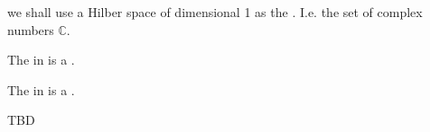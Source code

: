 \begin{example}
  \label{ex:quant_terminal_object}
we shall use a Hilber space of dimensional 1 as the
. I.e. the set of complex numbers
$\mathbb{C}$.   
\end{example}

\begin{example}
  \label{ex:quant_product}
  The  in  is a
  .
\end{example}

\begin{example}
  \label{ex:quant_sum}
  The  in  is a
  .
\end{example}

TBD

